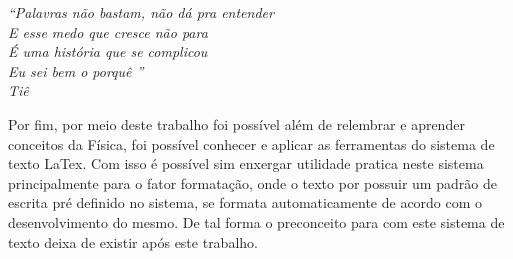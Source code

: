 
	\begin{flushright}
		\textit{``Palavras não bastam, não dá pra entender\\
                    E esse medo que cresce não para\\
                    É uma história que se complicou\\
                    Eu sei bem o porquê ''\\Tiê}
	    \end{flushright}
	    
	    Por fim, por meio deste trabalho foi possível além de relembrar e aprender conceitos da Física, foi possível conhecer e aplicar as ferramentas do sistema de texto LaTex.
	    Com isso é possível sim enxergar utilidade pratica neste sistema principalmente para o fator formatação, onde o texto por possuir um padrão de escrita pré definido no sistema, se formata automaticamente de acordo com o desenvolvimento do mesmo.
	    De tal forma o preconceito para com este sistema de texto deixa de existir após este trabalho.
